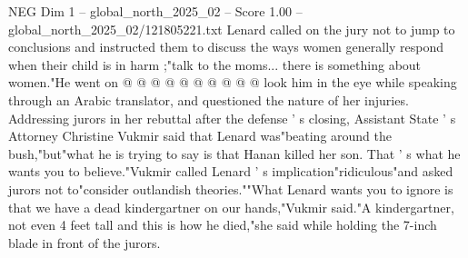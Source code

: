 \begin{textsample}{NEG Dim 1 – global\_north\_2025\_02 – Score 1.00 – global\_north\_2025\_02/121805221.txt}
Lenard called on the jury not to jump to conclusions and instructed them to discuss the ways women generally respond when their child is in harm ;"talk to the moms... there is something about women."He went on @ @ @ @ @ @ @ @ @ @ look him in the eye while speaking through an Arabic translator, and questioned the nature of her injuries.
Addressing jurors in her rebuttal after the defense ' s closing, Assistant State ' s Attorney Christine Vukmir said that Lenard was"beating around the bush,"but"what he is trying to say is that Hanan killed her son.
That ' s what he wants you to believe."Vukmir called Lenard ' s implication"ridiculous"and asked jurors not to"consider outlandish theories.""What Lenard wants you to ignore is that we have a dead kindergartner on our hands,"Vukmir said."A kindergartner, not even 4 feet tall and this is how he died,"she said while holding the 7-inch blade in front of the jurors.

\end{textsample}

